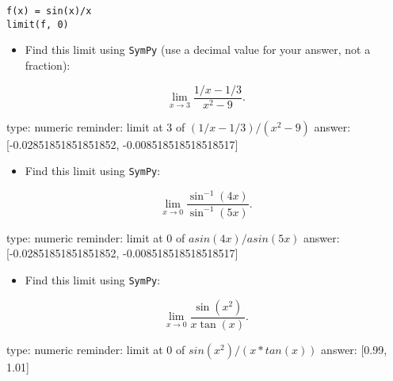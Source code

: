 \documentclass[12pt]{article}
\begin{document}
\begin{verbatim}
f(x) = sin(x)/x
limit(f, 0)
\end{verbatim}
\begin{itemize}
\itemsep1pt\parskip0pt
\item
  Find this limit using \texttt{SymPy} (use a decimal value for your
  answer, not a fraction):
\end{itemize}

\[
\lim_{x \rightarrow 3} \frac{1/x - 1/3}{x^2 - 9}.
\]

\begin{answer}
    type: numeric
    reminder: limit at 3 of \( (1/x - 1/3) / (x^2 - 9) \)
    answer: [-0.02851851851851852, -0.008518518518518517]

\end{answer}

\begin{itemize}
\itemsep1pt\parskip0pt
\item
  Find this limit using \texttt{SymPy}:
\end{itemize}

\[
\lim_{x \rightarrow 0} \frac{\sin^{-1}(4x)}{\sin^{-1}(5x)}.
\]

\begin{answer}
    type: numeric
    reminder: limit at 0 of \( asin(4x)/asin(5x) \)
    answer: [-0.02851851851851852, -0.008518518518518517]

\end{answer}

\begin{itemize}
\itemsep1pt\parskip0pt
\item
  Find this limit using \texttt{SymPy}:
\end{itemize}

\[
\lim_{x \rightarrow 0} \frac{\sin(x^2)}{x\tan(x)}.
\]

\begin{answer}
    type: numeric
    reminder: limit at 0 of \( sin(x^2)/(x*tan(x)) \)
    answer: [0.99, 1.01]

\end{answer}
\end{document}
